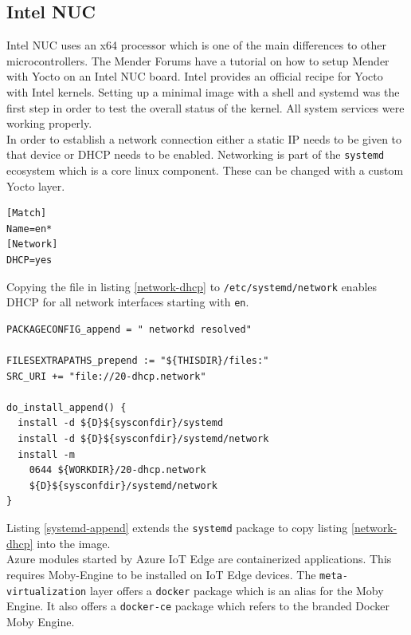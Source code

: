 \subsection{Intel NUC}
Intel NUC uses an x64 processor which is one of the main differences to other microcontrollers. The Mender Forums have a tutorial on how to setup Mender with Yocto on an Intel NUC board.\cite{intel-mender-yocto} Intel provides an official recipe for Yocto with Intel kernels. Setting up a minimal image with a shell and systemd was the first step in order to test the overall status of the kernel. All system services were working properly.\\
In order to establish a network connection either a static IP needs to be given to that device or DHCP needs to be enabled. Networking is part of the \verb|systemd| ecosystem which is a core linux component. These can be changed with a custom Yocto layer.
\begin{code}
  \label{network-dhcp}
  \begin{verbatim}
[Match]
Name=en*
[Network]
DHCP=yes
  \end{verbatim}
\end{code}
Copying the file in listing \ref{network-dhcp} to \verb|/etc/systemd/network| enables DHCP for all network interfaces starting with \verb|en|.
\begin{code}
  \label{systemd-append}
  \begin{verbatim}
PACKAGECONFIG_append = " networkd resolved"

FILESEXTRAPATHS_prepend := "${THISDIR}/files:"
SRC_URI += "file://20-dhcp.network"

do_install_append() {
  install -d ${D}${sysconfdir}/systemd
  install -d ${D}${sysconfdir}/systemd/network
  install -m 
    0644 ${WORKDIR}/20-dhcp.network
    ${D}${sysconfdir}/systemd/network
}
  \end{verbatim}
\end{code}
Listing \ref{systemd-append} extends the \verb|systemd| package to copy listing \ref{network-dhcp} into the image.\\
Azure modules started by Azure IoT Edge are containerized applications. This requires Moby-Engine to be installed on IoT Edge devices. The \verb|meta-virtualization| layer offers a \verb|docker| package which is an alias for the Moby Engine. It also offers a \verb|docker-ce| package which refers to the branded Docker Moby Engine.\\

